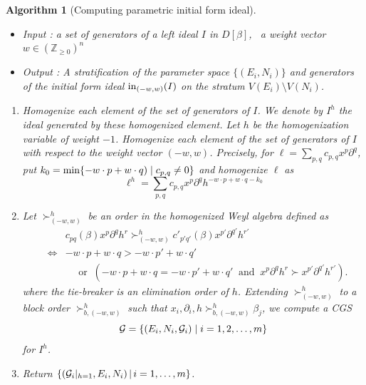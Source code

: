 \documentclass{article}
\def\ZZ{\mathbb{Z}}
\def\pd#1{\partial_{#1}}
\newtheorem{algorithm}{Algorithm}
\begin{document}
\begin{algorithm}[Computing parametric initial form ideal]\rm \label{alg:CGS}
~~
\begin{itemize}
\item
Input : a set of generators of a left ideal  $I$ 
in $D[\beta]$,~ a weight vector $w \in (\ZZ_{\geq 0})^n$
\item
Output : A stratification of the parameter space
$\{(E_i,N_i)\}$ and
generators of the initial form ideal ${\rm in}_{(-w,w)}(I)$ on the stratum $V(E_i) \setminus V(N_i)$.
\end{itemize}
\begin{enumerate}
\item
{}
Homogenize each element of the set of generators of $I$. 
We denote by $I^h$
the ideal generated by these homogenized element.
Let $h$ be the homogenization variable 
of weight $-1$.
Homogenize 
each element of the set of generators of $I$ 
with respect to the weight vector $(-w,w)$.
Precisely,
for $\ell = \sum_{p, q} c_{p, q} x^p \partial^q$,
put
$k_0 = {\rm min}\{ -w \cdot p + w \cdot q) \mid c_{p, q} \neq 0\}$
and homogenize $\ell$ as
$$
\ell^h = \sum_{p, q} c_{p, q} x^p \partial^q h^{-w\cdot p+w\cdot q - k_0}
$$
\fi

\item 
Let $\succ^h_{(-w,w)}$ be an order in the homogenized Weyl algebra
defined as 
\begin{eqnarray*}
&&  c_{pq}(\beta) x^p \pd{}^q h^r \succ^h_{(-w,w)}  c'_{p'q'}(\beta) x^{p'} \pd{}^{q'} h^{r'} \\
&\Leftrightarrow&
 -w\cdot p + w \cdot q >  -w\cdot p' + w \cdot q' \\
 & & \quad \mbox{ or } \ 
 (-w\cdot p + w \cdot q =  -w\cdot p' + w \cdot q' \ \mbox{ and } \ 
  x^p \pd{}^q h^r \succ x^{p'} \pd{}^{q'} h^{r'}). 
\end{eqnarray*}
where the tie-breaker is an elimination order of $h$.
Extending $\succ^h_{(-w,w)}$ to a block order $\succ^h_{b,(-w,w)}$
such that $x_i, \pd{i}, h \succ^h_{b,(-w,w)} \beta_j$,
we compute a CGS 
$$
\mathcal{G} = \{(E_i, N_i, {\cal G}_i) \mid i = 1, 2, \ldots, m\}
$$
for $I^h$.


\item 
Return $\{ ({\cal G}_i|_{h=1}, E_i, N_i)\,|\, i=1, \ldots, m\}$.
\end{enumerate}
\end{algorithm}
\end{document}
